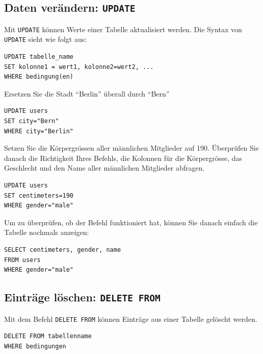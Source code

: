 \subsection{Daten verändern: \texorpdfstring{\lstinline|UPDATE|}{UPDATE}}

Mit \lstinline|UPDATE| können Werte einer Tabelle aktualisiert werden. Die Syntax von \lstinline|UPDATE| sieht wie folgt aus:

\begin{lstlisting}
UPDATE tabelle_name
SET kolonne1 = wert1, kolonne2=wert2, ...
WHERE bedingung(en)
\end{lstlisting}

\begin{myexercise}\label{aufgabe:evalPoly}

  Ersetzen Sie die Stadt ``Berlin'' überall durch ``Bern''
  \begin{myanswer}
    \begin{lstlisting}
UPDATE users
SET city="Bern"
WHERE city="Berlin"
\end{lstlisting}
  \end{myanswer}
\end{myexercise}

\begin{mysubmission}
  Setzen Sie die Körpergrössen aller männlichen Mitglieder auf 190. Überprüfen Sie danach die Richtigkeit Ihres Befehls, die Kolonnen für die Körpergrösse, das Geschlecht und den Name aller männlichen Mitglieder abfragen.
  \begin{myanswer}
    \begin{lstlisting}
UPDATE users
SET centimeters=190
WHERE gender="male"
\end{lstlisting}
Um zu überprüfen, ob der Befehl funktioniert hat, können Sie danach einfach die Tabelle nochmals anzeigen:
\begin{lstlisting}
SELECT centimeters, gender, name
FROM users
WHERE gender="male"
\end{lstlisting}

  \end{myanswer}
\end{mysubmission}

\subsection{Einträge löschen: \texorpdfstring{\lstinline|DELETE FROM|}{DELETE FROM}}
Mit dem Befehl \lstinline|DELETE FROM| können Einträge aus einer Tabelle gelöscht werden.
\begin{lstlisting}
DELETE FROM tabellenname
WHERE bedingungen
\end{lstlisting}

